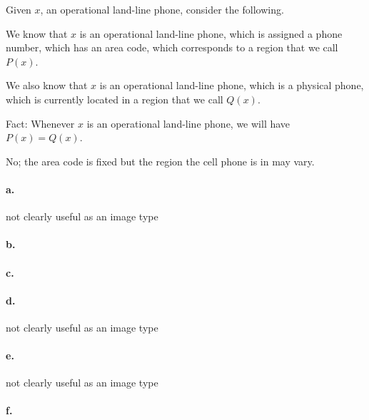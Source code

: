 Given $x$, an operational land-line phone, consider the following.

We know that $x$ is an operational land-line phone, which is assigned
a phone number, which has an area code, which corresponds to a region
that we call $P(x)$.

We also know that $x$ is an operational land-line phone, which is a
physical phone, which is currently located in a region that we call
$Q(x)$.

Fact: Whenever $x$ is an operational land-line phone, we will have
$P(x) = Q(x)$.


No; the area code is fixed but the region the cell phone is in may vary.


\paragraph{a.}
not clearly useful as an image type
\paragraph{b.}
\paragraph{c.}
\paragraph{d.}
not clearly useful as an image type
\paragraph{e.}
not clearly useful as an image type
\paragraph{f.}


